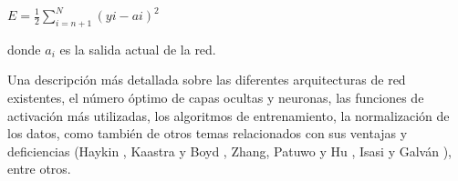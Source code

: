 \vspace*{0.2 cm}

\begin{center}
$\displaystyle{E = \frac{1}{2} \sum_{i=n+1}^{N}(y{i}-a{i})^2 }$
\end{center}

\vspace*{0.2 cm}


\noindent  donde $a_{i}$ es la salida actual de la red.

\hspace*{0.4 cm}Una descripci\'on m\'as detallada sobre las diferentes arquitecturas de red existentes, el n\'umero \'optimo de capas ocultas y neuronas, las funciones de activaci\'on m\'as utilizadas, los algoritmos de entrenamiento, la normalizaci\'on de los datos, como tambi\'en de otros temas relacionados con sus ventajas y deficiencias (Haykin \cite{Ha}, Kaastra y Boyd \cite{KB}, Zhang, Patuwo y Hu \cite{ZPH}, Isasi y Galv\'an \cite{IG}), entre otros.



% 
% 

